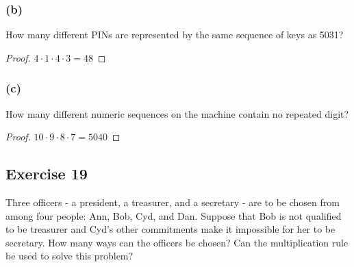 \documentclass[14pt]{extarticle}
\begin{document}
\subsubsection{(b)}
How many different PINs are represented by the same sequence of keys as 5031?

\begin{proof}
     \(4 \cdot 1 \cdot 4 \cdot 3 = 48\)
\end{proof}

\subsubsection{(c)}
How many different numeric sequences on the machine contain no repeated digit?

\begin{proof}
     \(10 \cdot 9 \cdot 8 \cdot 7 = 5040\)
\end{proof}

\subsection{Exercise 19}
Three officers - a president, a treasurer, and a secretary - are to be chosen from among four people: Ann, Bob, Cyd,
and Dan. Suppose that Bob is not qualified to be treasurer and Cyd’s other commitments make it impossible for her to
be secretary. How many ways can the officers be chosen? Can the multiplication rule be used to solve this problem?
\end{document}
